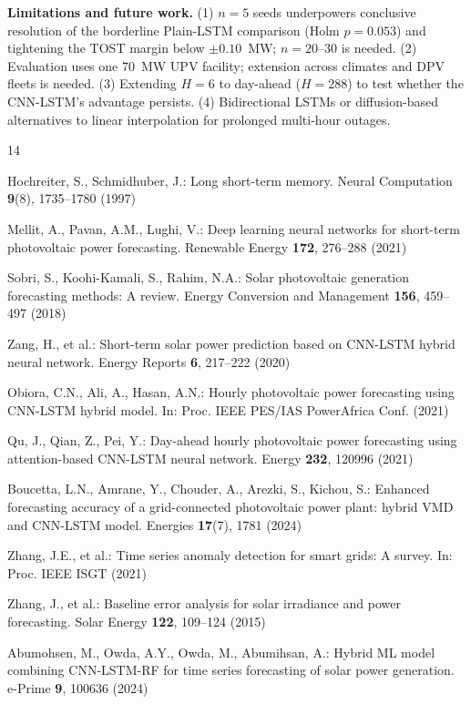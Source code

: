 \documentclass[runningheads]{llncs}
\begin{document}
\noindent\textbf{Limitations and future work.} (1) $n=5$ seeds underpowers conclusive resolution of the borderline Plain-LSTM comparison (Holm $p=0.053$) and tightening the TOST margin below $\pm0.10$~MW; $n=20$--30 is needed. (2) Evaluation uses one 70~MW UPV facility; extension across climates and DPV fleets is needed. (3) Extending $H=6$ to day-ahead ($H=288$) to test whether the CNN-LSTM's advantage persists. (4) Bidirectional LSTMs or diffusion-based alternatives to linear interpolation for prolonged multi-hour outages.

\begin{thebibliography}{14}

 Hochreiter, S., Schmidhuber, J.: Long short-term memory. Neural Computation \textbf{9}(8), 1735--1780 (1997)

 Mellit, A., Pavan, A.M., Lughi, V.: Deep learning neural networks for short-term photovoltaic power forecasting. Renewable Energy \textbf{172}, 276--288 (2021)

 Sobri, S., Koohi-Kamali, S., Rahim, N.A.: Solar photovoltaic generation forecasting methods: A review. Energy Conversion and Management \textbf{156}, 459--497 (2018)

 Zang, H., et al.: Short-term solar power prediction based on CNN-LSTM hybrid neural network. Energy Reports \textbf{6}, 217--222 (2020)

 Obiora, C.N., Ali, A., Hasan, A.N.: Hourly photovoltaic power forecasting using CNN-LSTM hybrid model. In: Proc. IEEE PES/IAS PowerAfrica Conf. (2021)

 Qu, J., Qian, Z., Pei, Y.: Day-ahead hourly photovoltaic power forecasting using attention-based CNN-LSTM neural network. Energy \textbf{232}, 120996 (2021)

 Boucetta, L.N., Amrane, Y., Chouder, A., Arezki, S., Kichou, S.: Enhanced forecasting accuracy of a grid-connected photovoltaic power plant: hybrid VMD and CNN-LSTM model. Energies \textbf{17}(7), 1781 (2024)

 Zhang, J.E., et al.: Time series anomaly detection for smart grids: A survey. In: Proc. IEEE ISGT (2021)

 Zhang, J., et al.: Baseline error analysis for solar irradiance and power forecasting. Solar Energy \textbf{122}, 109--124 (2015)

 Abumohsen, M., Owda, A.Y., Owda, M., Abumihsan, A.: Hybrid ML model combining CNN-LSTM-RF for time series forecasting of solar power generation. e-Prime \textbf{9}, 100636 (2024)


\end{thebibliography}
\end{document}
